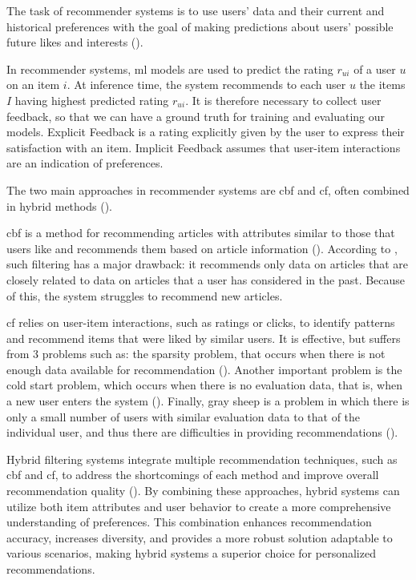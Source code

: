 The task of recommender systems is to use users' data and their current and historical preferences with the goal of making predictions about users' possible future likes and interests (\cite{Lu2012}).

In recommender systems, \gls{ml} models are used to predict the rating $r_{ui}$ of a user $u$ on an item $i$.
At inference time, the system recommends to each user $u$ the items $I$ having highest predicted rating $r_{ui}$.
It is therefore necessary to collect user feedback, so that we can have a ground truth for training and evaluating our models.
Explicit Feedback is a rating explicitly given by the user to express their satisfaction with an item.
Implicit Feedback assumes that user-item interactions are an indication of preferences.

The two main approaches in recommender systems are \gls{cbf} and \gls{cf}, often combined in hybrid methods (\cite{Ko2022}).

\gls{cbf} is a method for recommending articles with attributes similar to those that users like and recommends them based on article information (\cite{Vallet2006}).
According to \cite{salter2006cinemascreen}, such filtering has a major drawback: it recommends only data on articles that are closely related to data on articles that a user has considered in the past. Because of this, the system struggles to recommend new articles. 

\gls{cf} relies on user-item interactions, such as ratings or clicks, to identify patterns and recommend items that were liked by similar users.
It is effective, but suffers from 3 problems such as: the sparsity problem, that occurs when there is not enough data available for recommendation (\cite{Plexousakis2005}).
Another important problem is the cold start problem, which occurs when there is no evaluation data, that is, when a new user enters the system (\cite{WEI201729}).
Finally, gray sheep is a problem in which there is only a small number of users with similar evaluation data to that of the individual user, and thus there are difficulties in providing recommendations (\cite{Gras2016}).

Hybrid filtering systems integrate multiple recommendation techniques, such as \gls{cbf} and \gls{cf}, to address the shortcomings of each method and improve overall recommendation quality (\cite{Ko2022}).
By combining these approaches, hybrid systems can utilize both item attributes and user behavior to create a more comprehensive understanding of preferences.
This combination enhances recommendation accuracy, increases diversity, and provides a more robust solution adaptable to various scenarios, making hybrid systems a superior choice for personalized recommendations.

